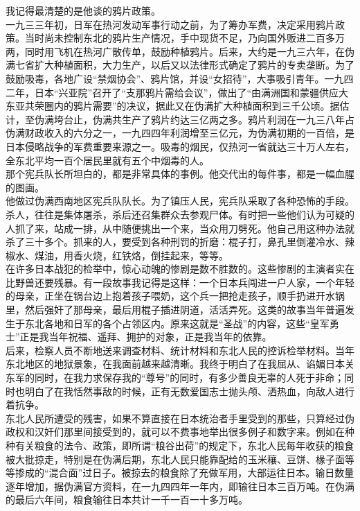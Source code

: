 我记得最清楚的是他谈的鸦片政策。\\

一九三三年初，日军在热河发动军事行动之前，为了筹办军费，决定采用鸦片政策。当时尚未控制东北的鸦片生产情况，手中现货不足，乃向国外贩进二百多万两，同时用飞机在热河广散传单，鼓励种植鸦片。后来，大约是一九三六年，在伪满七省扩大种植面积，大力生产，以后又以法律形式确定了鸦片的专卖垄断。为了鼓励吸毒，各地广设“禁烟协会”、鸦片馆，并设“女招待”，大事吸引青年。一九四二年，日本“兴亚院”召开了“支那鸦片需给会议”，做出了“由满洲国和蒙疆供应大东亚共荣圈内的鸦片需要”的决议，据此又在伪满扩大种植面积到三千公顷。据估计，至伪满垮台止，伪满共生产了鸦片约达三亿两之多。鸦片利润在一九三八年占伪满财政收入的六分之一，一九四四年利润增至三亿元，为伪满初期的一百倍，是日本侵略战争的军费重要来源之一。吸毒的烟民，仅热河一省就达三十万人左右，全东北平均一百个居民里就有五个中烟毒的人。\\

那个宪兵队长所坦白的，都是非常具体的事例。他交代出的每件事，都是一幅血腥的图画。\\

他做过伪满西南地区宪兵队队长。为了镇压人民，宪兵队采取了各种恐怖的手段。杀人，往往是集体屠杀，杀后还召集群众去参观尸体。有时把一些他们认为可疑的人抓了来，站成一排，从中随便挑出一个来，当众用刀劈死。他自己用这种办法就杀了三十多个。抓来的人，要受到各种刑罚的折磨：棍子打，鼻孔里倒灌冷水、辣椒水、煤油，用香火烧，红铁烙，倒挂起来，等等。\\

在许多日本战犯的检举中，惊心动魄的惨剧是数不胜数的。这些惨剧的主演者实在比野兽还要残暴。有一段故事我记得是这样：一个日本兵闯进一户人家，一个年轻的母亲，正坐在锅台边上抱着孩子喂奶，这个兵一把抢走孩子，顺手扔进开水锅里，然后强奸了那母亲，最后用棍子插进阴道，活活弄死。这类的故事当年普遍发生于东北各地和日军的各个占领区内。原来这就是“圣战”的内容，这些“皇军勇士”正是我当年祝福、遥拜、拥护的对象，正是我当年的依靠。\\

后来，检察人员不断地送来调查材料、统计材料和东北人民的控诉检举材料。当年东北地区的地狱景象，在我面前越来越清晰。我终于明白了在我屈从、谄媚日本关东军的同时，在我力求保存我的“尊号”的同时，有多少善良无辜的人死于非命；同时也明白了在我恬然事敌的时候，正有无数爱国志士抛头颅、洒热血，向敌人进行着抗争。\\

东北人民所遭受的残害，如果不算直接在日本统治者手里受到的那些，只算经过伪政权和汉奸们那里间接受到的，就可以不费事地举出很多例子和数字来。例如在种种有关粮食的法令、政策，即所谓“粮谷出荷”的规定下，东北人民每年收获的粮食被大批掠走，特别是在伪满后期，东北人民只能靠配给的玉米穰、豆饼、椽子面等等掺成的“混合面”过日子。被掠去的粮食除了充做军用，大部运往日本。输日数量逐年增加，据伪满官方资料，在一九四四年一年内，即输往日本三百万吨。在伪满的最后六年间，粮食输往日本共计一千一百一十多万吨。\\

